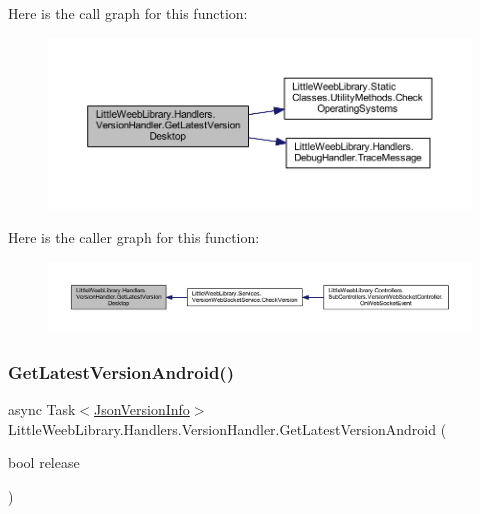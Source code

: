 Here is the call graph for this function\+:\nopagebreak
\begin{figure}[H]
\begin{center}
\leavevmode
\includegraphics[width=350pt]{class_little_weeb_library_1_1_handlers_1_1_version_handler_ad4dc752be10a1b3cc2d546dc1d4d6bff_cgraph}
\end{center}
\end{figure}
Here is the caller graph for this function\+:\nopagebreak
\begin{figure}[H]
\begin{center}
\leavevmode
\includegraphics[width=350pt]{class_little_weeb_library_1_1_handlers_1_1_version_handler_ad4dc752be10a1b3cc2d546dc1d4d6bff_icgraph}
\end{center}
\end{figure}
\mbox{\label{class_little_weeb_library_1_1_handlers_1_1_version_handler_a4021041fcc24a7f9489060c598222891}} 
\subsubsection{\texorpdfstring{Get\+Latest\+Version\+Android()}{GetLatestVersionAndroid()}}
{\footnotesize\ttfamily async Task$<$\mbox{\hyperlink{class_little_weeb_library_1_1_models_1_1_json_version_info}{Json\+Version\+Info}}$>$ Little\+Weeb\+Library.\+Handlers.\+Version\+Handler.\+Get\+Latest\+Version\+Android (\begin{DoxyParamCaption}\item[{bool}]{release }\end{DoxyParamCaption})}



